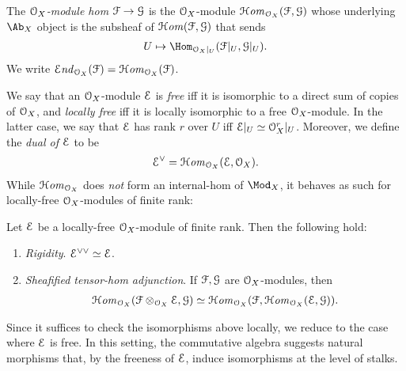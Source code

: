 \documentclass[10pt,final,oneside]{amsbook}
\makeatletter
\renewenvironment{proof}[1][\proofname] 
{ 	
	\par\pushQED{\qed}\normalfont\topsep6\p@\@plus6\p@\relax\trivlist\itemindent\normalparindent
	\item[\hskip\labelsep\itshape#1\@addpunct{.}]\ignorespaces
}
{
	\popQED\endtrivlist\@endpefalse
}
\numberwithin{equation}{section}
\newcommand{\SHom}{{\mathcal{H}\mathit{om}}}
\newcommand{\SEnd}{{\mathcal{E}\mathit{nd}}}
\makeatother
\begin{document}
The \emph{$\cal{O}_X$-module hom $\cal{F} \to \cal{G}$} is the $\cal{O}_X$-module $\SHom_{\cal{O}_X}(\cal{F}, \cal{G})$ whose underlying $\Ab_X$ object is the subsheaf of $\SHom(\cal{F}, \cal{G})$ that sends 
\begin{align}
U \mapsto \Hom_{\cal{O}_X|_U}(\cal{F}|_U, \cal{G}|_U).
\end{align}
We write $\SEnd_{\cal{O}_X}(\cal{F}) = \SHom_{\cal{O}_X}(\cal{F})$.

We say that an $\cal{O}_X$-module $\cal{E}$ is \emph{free} iff it is isomorphic to a direct sum of copies of $\cal{O}_X$, and \emph{locally free} iff it is locally isomorphic to a free $\cal{O}_X$-module.
In the latter case, we say that $\cal{E}$ has rank $r$ over $U$ iff $\cal{E}|_U \simeq \cal{O}_X^r|_U$.
Moreover, we define the \emph{dual of $\cal{E}$} to be
\begin{align}
\cal{E}^\vee = \SHom_{\cal{O}_X}(\cal{E}, \cal{O}_X).
\end{align}
While $\SHom_{\cal{O}_X}$ does \emph{not} form an internal-hom of $\Mod_X$, it behaves as such for locally-free $\cal{O}_X$-modules of finite rank:

\begin{prop}
Let $\cal{E}$ be a locally-free $\cal{O}_X$-module of finite rank.
Then the following hold:
\begin{enumerate}
\item 	\emph{Rigidity}.
			$\cal{E}^{\vee\vee} \simeq \cal{E}$.
\item 	\emph{Sheafified tensor-hom adjunction}.
			If $\cal{F}, \cal{G}$ are $\cal{O}_X$-modules, then
			\begin{align}
			\SHom_{\cal{O}_X}(\cal{F} \otimes_{\cal{O}_X} \cal{E}, \cal{G})
			\simeq 	
			\SHom_{\cal{O}_X}(\cal{F}, \SHom_{\cal{O}_X}(\cal{E},\cal{G})).
			\end{align}
\end{enumerate}
\end{prop}

\begin{proof}
Since it suffices to check the isomorphisms above locally, we reduce to the case where $\cal{E}$ is free.
In this setting, the commutative algebra suggests natural morphisms that, by the freeness of $\cal{E}$, induce isomorphisms at the level of stalks.
\end{proof}

\subsection{}
\end{document}
